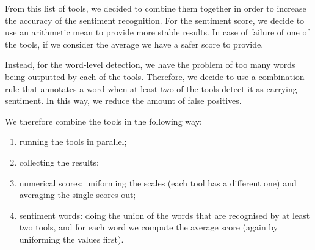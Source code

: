 From this list of tools, we decided to combine them together in order to increase the accuracy of the sentiment recognition. %
For the sentiment score, we decide to use an arithmetic mean to provide more stable results.
In case of failure of one of the tools, if we consider the average we have a safer score to provide.

Instead, for the word-level detection, we have the problem of too many words being outputted by each of the tools.
Therefore, we decide to use a combination rule that annotates a word when at least two of the tools detect it as carrying sentiment.
In this way, we reduce the amount of false positives.

We therefore combine the tools in the following way:
\begin{enumerate}
    \item running the tools in parallel;
    \item collecting the results;
    \item numerical scores: uniforming the scales (each tool has a different one) and averaging the single scores out;
    \item sentiment words: doing the union of the words that are recognised by at least two tools, and for each word we compute the average score (again by uniforming the values first).
\end{enumerate}

